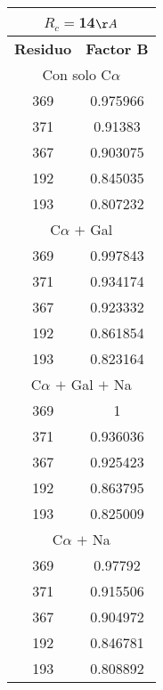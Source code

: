 \begin{tabular}[c]{|c|c|}
\multicolumn{2}{c}{$R_c=$14$\AA$}\\\hline
\textbf{Residuo}&\textbf{Factor B}\\\hline
\multicolumn{2}{c}{Con solo C$\alpha$}\\\hline
       369&  0.975966\\
       371&   0.91383\\
       367&  0.903075\\
       192&  0.845035\\
       193&  0.807232\\
\hline
\multicolumn{2}{c}{C$\alpha$ $+$ Gal}\\\hline
       369&  0.997843\\
       371&  0.934174\\
       367&  0.923332\\
       192&  0.861854\\
       193&  0.823164\\
\hline
\multicolumn{2}{c}{C$\alpha$ $+$ Gal $+$ Na}\\\hline
       369&         1\\
       371&  0.936036\\
       367&  0.925423\\
       192&  0.863795\\
       193&  0.825009\\
\hline
\multicolumn{2}{c}{C$\alpha$ $+$ Na}\\\hline
       369&   0.97792\\
       371&  0.915506\\
       367&  0.904972\\
       192&  0.846781\\
       193&  0.808892\\
\hline
\end{tabular}
